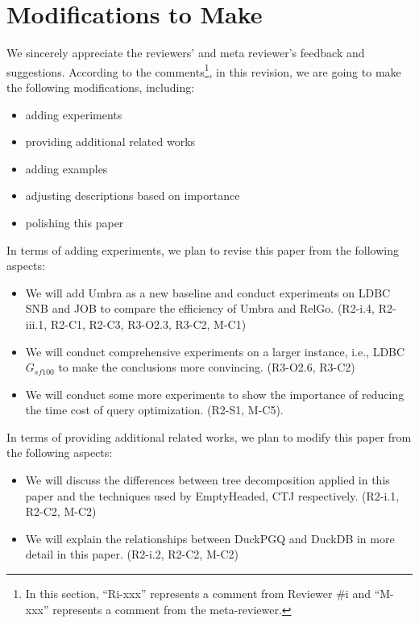 \section{Modifications to Make}
\label{sec:modifications}

We sincerely appreciate the reviewers' and meta reviewer's feedback and suggestions.
According to the comments\footnote{In this section, ``Ri-xxx'' represents a comment from Reviewer \#i and ``M-xxx'' represents a comment from the meta-reviewer.}, in this revision, we are going to make the following modifications, including:
\begin{itemize}
    \item adding experiments
    \item providing additional related works
    \item adding examples
    \item adjusting descriptions based on importance
    \item polishing this paper
\end{itemize}

In terms of adding experiments, we plan to revise this paper from the following aspects:
\begin{itemize}
    \item We will add Umbra as a new baseline and conduct experiments on LDBC SNB and JOB to compare the efficiency of Umbra and RelGo. (R2-i.4, R2-iii.1, R2-C1, R2-C3, R3-O2.3, R3-C2, M-C1)
    \item We will conduct comprehensive experiments on a larger instance, i.e., LDBC $G_{sf100}$ to make the conclusions more convincing. (R3-O2.6, R3-C2)
    \item We will conduct some more experiments to show the importance of reducing the time cost of query optimization. (R2-S1, M-C5).
\end{itemize}

In terms of providing additional related works, we plan to modify this paper from the following aspects:
\begin{itemize}
    \item We will discuss the differences between tree decomposition applied in this paper and the techniques used by EmptyHeaded, CTJ respectively. (R2-i.1, R2-C2, M-C2)
    \item We will explain the relationships between DuckPGQ and DuckDB in more detail in this paper. (R2-i.2, R2-C2, M-C2)
\end{itemize}

